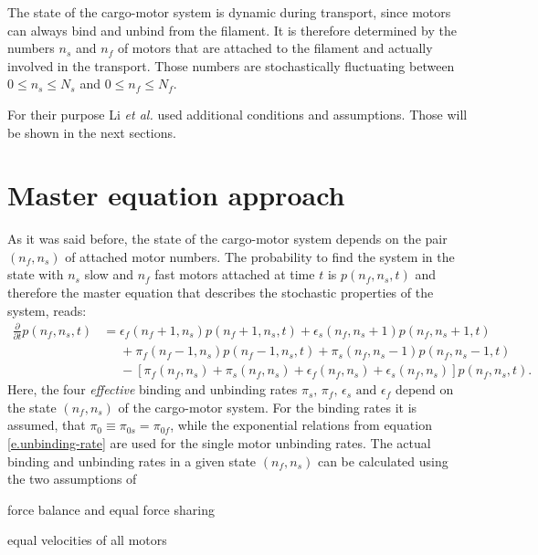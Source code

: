 The state of the cargo-motor system is dynamic during transport, since motors can always bind and unbind from the filament. It is therefore determined by the numbers $n_s$ and $n_f$ of motors that
are attached to the filament and actually involved in the transport. Those numbers are stochastically fluctuating between \mbox{$0 \leq n_s \leq N_s$} and \mbox{$0 \leq n_f \leq N_f$}.

For their purpose Li \textit{et al.} \cite{li} used additional conditions and assumptions. Those will be shown in the next sections.


\section{Master equation approach}\label{s.master-equation-approach}
As it was said before, the state of the cargo-motor system depends on the pair \mbox{$\left(n_f, n_s\right)$} of attached motor numbers. The probability to find the system in the state with $n_s$
slow and $n_f$ fast motors attached at time $t$ is $p\left(n_f, n_s, t\right)$ and therefore the master equation that describes the stochastic properties of the system, reads:
\begin{equation}\label{e.master-equation}
\begin{aligned}
 \frac{\partial}{\partial t} p\left(n_f, n_s, t\right) &= \epsilon_f\left(n_f + 1, n_s\right)p\left(n_f + 1, n_s, t\right) + \epsilon_s\left(n_f, n_s + 1\right)p\left(n_f, n_s + 1, t\right) \\
 &\phantom{=}+ \pi_f\left(n_f - 1, n_s\right)p\left(n_f - 1, n_s, t\right) + \pi_s\left(n_f, n_s - 1\right)p\left(n_f, n_s - 1, t\right) \\
 &\phantom{=}- \left[\pi_f\left(n_f, n_s\right) + \pi_s\left(n_f, n_s\right) + \epsilon_f\left(n_f, n_s\right) + \epsilon_s\left(n_f, n_s\right)\right]p\left(n_f, n_s, t\right).
\end{aligned}
\end{equation}
Here, the four \textit{effective} binding and unbinding rates \mbox{$\pi_s\text{, } \pi_f\text{, } \epsilon_s \text{ and } \epsilon_f$} depend on the state \mbox{$\left(n_f, n_s\right)$} of the cargo-motor
system. For the binding rates it is assumed, that \mbox{$\pi_0 \equiv \pi_{0s} = \pi_{0f}$}, while the exponential relations from equation \eqref{e.unbinding-rate} are used
for the single motor unbinding rates. The actual binding and unbinding rates in a given state \mbox{$\left(n_f, n_s\right)$} can be calculated using the two assumptions of
\begin{compactenum}[(i)]
 \item force balance and equal force sharing
 \item equal velocities of all motors
\end{compactenum}
